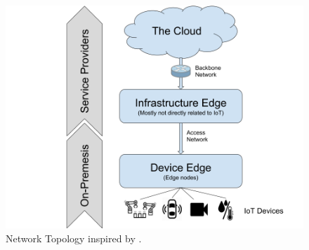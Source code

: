 \begin{figure}[h!]
    \centering
    \includegraphics[scale=0.3]{figures/netowork-topology.png}
    \caption{Network Topology inspired by \cite{iotGatewaySlavesGraph}.}
    \label{fig:netowrkTopology}
\end{figure}